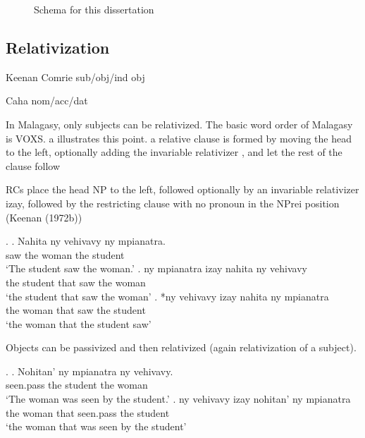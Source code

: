 \begin{figure}[H]
  \centering
  \label{fig:nomaccdat}
  \caption{Schema for this dissertation}
\end{figure}



\subsection{Relativization}

Keenan Comrie sub/obj/ind obj

Caha nom/acc/dat

In Malagasy, only subjects can be relativized. The basic word order of Malagasy is VOXS. a illustrates this point. a relative clause is formed by moving the head to the left, optionally adding the invariable relativizer , and let the rest of the clause follow


RCs place
the head NP to the left, followed optionally by an invariable relativizer izay, followed
by the restricting clause with no pronoun in the NPrei position (Keenan (1972b))


\ex.
\ag. Nahita ny vehivavy ny mpianatra.\\
 saw the woman the student\\
 `The student saw the woman.'
\bg. ny mpianatra izay nahita ny vehivavy\\
 the student that saw the woman\\
 `the student that saw the woman'
\bg. *ny vehivavy izay nahita ny mpianatra\\
 the woman that saw the student\\
 `the woman that the student saw' 

Objects can be passivized and then relativized (again relativization of a subject).

\ex.
\ag. Nohitan' ny mpianatra ny vehivavy.\\
 seen.\ac{pass} the student the woman\\
 `The woman was seen by the student.'
\bg. ny vehivavy izay nohitan' ny mpianatra\\
 the woman that seen.\ac{pass} the student\\
 `the woman that was seen by the student' 

